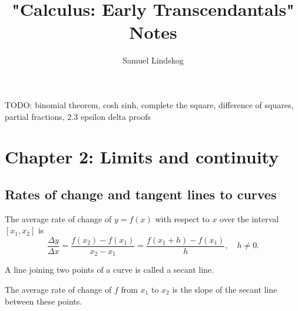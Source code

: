 \documentclass{article}
\title{"Calculus: Early Transcendantals" Notes}
\author{Samuel Lindskog}
\begin{document}
\maketitle
{}
\tableofcontents
{}
\clearpage
{}
\setcounter{page}{1}
TODO: binomial theorem, cosh sinh, complete the square, difference of squares, partial fractions, 2.3 epsilon delta proofs
\section{Chapter 2: Limits and continuity}
\subsection{Rates of change and tangent lines to curves}
\begin{definition}
	The average rate of change of \(y=f(x)\) with respect to \(x\) over the interval \([x_1,x_2]\) is
	\begin{equation*}
		\frac{\Delta y}{\Delta x}=\frac{f(x_2)-f(x_1)}{x_2-x_1}=\frac{f(x_1+h)-f(x_1)}{h},\quad h\neq 0.
	\end{equation*}
\end{definition}
\begin{definition}
	A line joining two points of a curve is called a secant line.
\end{definition}
\begin{remark}
	The average rate of change of \(f\) from \(x_1\) to \(x_2\) is the slope of the secant line between these points.
\end{remark}
\end{document}
